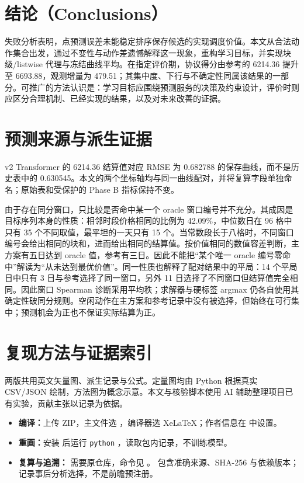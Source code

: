 \documentclass[11pt,a4paper]{article}
\begin{document}
\section{结论（Conclusions）}
失败分析表明，点预测误差未能稳定排序保存候选的实现调度价值。本文从合法动作集合出发，通过不变性与动作差遗憾解释这一现象，重构学习目标，并实现块级/listwise 代理与冻结曲线平均。在指定评价期，协议得分由参考的 6214.36 提升至 6693.88，观测增量为 479.51；其集中度、下行与不确定性同属该结果的一部分。可推广的方法认识是：学习目标应围绕预测服务的决策及约束设计，评价时则应区分合理机制、已经实现的结果，以及对未来改善的证据。
\FloatBarrier



\appendix
\renewcommand{\arraystretch}{1.04}
\setlength{\textfloatsep}{9pt}
\setlength{\intextsep}{9pt}
\section{预测来源与派生证据}\label{app:provenance}

v2 Transformer 的 6214.36 结算值对应 RMSE 为 0.682788 的保存曲线，而不是历史表中的 0.630545。本文的两个坐标轴均与同一曲线配对，并将复算字段单独命名；原始表和受保护的 Phase B 指标保持不变。

由于存在同分窗口，只比较是否命中某一个 oracle 窗口编号并不充分。其成因是目标序列本身的性质：相邻时段价格相同的比例为 42.09\%，中位数日在 96 格中只有 35 个不同取值，最平坦的一天只有 15 个。当常数段长于八格时，不同窗口编号会给出相同的块和，进而给出相同的结算值。按价值相同的数值容差判断，主方案有五日达到 oracle 值，参考有三日。因此不能把“某个唯一 oracle 编号零命中”解读为“从未达到最优价值”。同一性质也解释了配对结果中的平局：14 个平局日中只有 3 日与参考选择了同一窗口，另外 11 日选择了不同窗口但结算值完全相同。因此窗口 Spearman 诊断采用平均秩；求解器与硬标签 argmax 仍各自使用其确定性破同分规则。空闲动作在主方案和参考记录中没有被选择，但始终在可行集中；预测机会为正也不保证实际结算为正。


\FloatBarrier

\section{复现方法与证据索引}
\small
两版共用英文矢量图、派生记录与公式。定量图均由 Python 根据真实 CSV/JSON 绘制，方法图为概念示意。本文与核验脚本使用 AI 辅助整理项目已有实验，贡献主张以记录为依据。

\begin{itemize}\small\raggedright
\item \textbf{编译：}上传 ZIP，主文件选 ，编译器选 XeLaTeX；作者信息在  中设置。
\item \textbf{重画：}安装  后运行 \texttt{python} ，读取包内记录，不训练模型。
\item \textbf{复算与追溯：} 需要原仓库，命令见 。 包含准确来源、SHA-256 与依赖版本； 记录事后分析选择，不是前瞻预注册。
\end{itemize}
\end{document}

